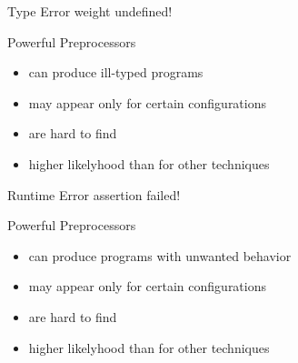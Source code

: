 \begin{frame}{\myframetitle}
	\begin{mycolumns}[T,animation=none,widths={74}]
	\mynextcolumn
		\begin{example}{Type Error}
			weight undefined!
		\end{example}

		\pause
		\begin{note}{Powerful Preprocessors}
			\setlength\leftmargini{3mm}
			\begin{itemize}
				\item can produce ill-typed programs
				\item may appear only for certain configurations
				\item are hard to find
				\item higher likelyhood than for other techniques
			\end{itemize}
			\lectureanalyses
		\end{note}
	\end{mycolumns}
\end{frame}

\begin{frame}{\myframetitle}
	\begin{mycolumns}[T,animation=none,widths={74}]
	\mynextcolumn
		\begin{example}{Runtime Error}
			assertion failed!
		\end{example}

		\pause
		\begin{note}{Powerful Preprocessors}
			\setlength\leftmargini{3mm}
			\begin{itemize}
				\item can produce programs with unwanted behavior
				\item may appear only for certain configurations
				\item are hard to find
				\item higher likelyhood than for other techniques
			\end{itemize}
			\lecturetesting
		\end{note}
	\end{mycolumns}
\end{frame}



